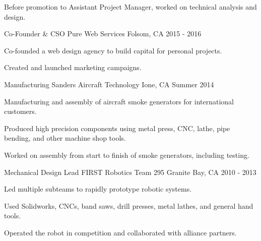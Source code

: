 \begin{cventries}
{\begin{cvitems}
       \item{Before promotion to Assistant Project Manager, worked on technical analysis and design.}
     \end{cvitems}
   }
      \cventry
    {Co-Founder \& CSO}
    {Pure Web Services}
    {Folsom, CA}
    {2015 - 2016}
    {
      \begin{cvitems}
        \item {Co-founded a web design agency to build capital for personal projects.}
        \item {Created and launched marketing campaigns.}
      \end{cvitems}
    } 
  \cventry
    {Manufacturing}
    {Sanders Aircraft Technology}
    {Ione, CA}
    {Summer 2014}
    {
      \begin{cvitems}
        \item{Manufacturing and assembly of aircraft smoke generators for international customers.}
        \item{Produced high precision components using metal press, CNC, lathe, pipe bending, and other machine shop tools.}
        \item{Worked on assembly from start to finish of smoke generators, including testing.}
      \end{cvitems}
    }
  \cventry
    {Mechanical Design Lead}
    {FIRST Robotics Team 295}
    {Granite Bay, CA}
    {2010 - 2013}
    {
      \begin{cvitems}
        \item{Led multiple subteams to rapidly prototype robotic systems.}
        \item{Used Solidworks, CNCs, band saws, drill presses, metal lathes, and general hand tools.}
        \item{Operated the robot in competition and collaborated with alliance partners.}
      \end{cvitems} 
    }
\end{cventries}
